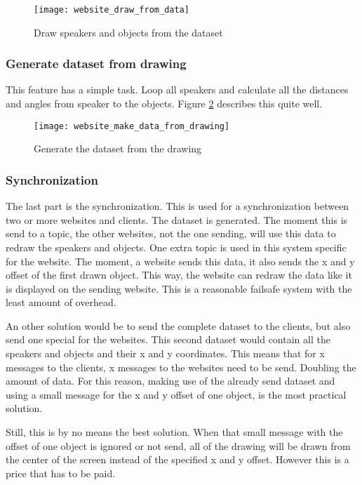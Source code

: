 \begin{figure}[H]
    \centering
    \texttt{[image: website\_draw\_from\_data]}
    \caption{Draw speakers and objects from the dataset}
    \label{fig:website_draw_from_data}
\end{figure}

\subsubsection{Generate dataset from drawing}
This feature has a simple task.
Loop all speakers and calculate all the distances and angles from speaker to the objects.
Figure \ref{fig:website_make_data_from_drawing} describes this quite well.

\begin{figure}[H]
    \centering
    \texttt{[image: website\_make\_data\_from\_drawing]}
    \caption{Generate the dataset from the drawing}
    \label{fig:website_make_data_from_drawing}
\end{figure}

\subsubsection{Synchronization}
The last part is the synchronization. This is used for a synchronization between two or more websites and clients.
The dataset is generated.
The moment this is send to a topic, the other websites, not the one sending, will use this data to redraw the speakers and objects.
One extra topic is used in this system specific for the website.
The moment, a website sends this data, it also sends the x and y offset of the first drawn object.
This way, the website can redraw the data like it is displayed on the sending website.
This is a reasonable failsafe system with the least amount of overhead.

An other solution would be to send the complete dataset to the clients, but also send one special for the websites.
This second dataset would contain all the speakers and objects and their x and y coordinates.
This means that for x messages to the clients, x messages to the websites need to be send.
Doubling the amount of data.
For this reason, making use of the already send dataset and using a small message for the x and y offset of one object, is the most practical solution.

Still, this is by no means the best solution.
When that small message with the offset of one object is ignored or not send, all of the drawing will be drawn from the center of the screen instead of the specified x and y offset.
However this is a price that has to be paid.

